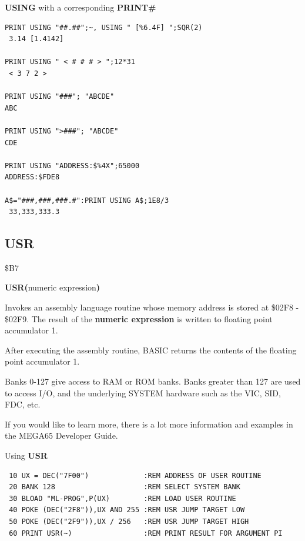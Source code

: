 \begin{description}[leftmargin=2cm,style=nextline]
\newpage
\item [Example:] {\bf USING} with a corresponding {\bf PRINT\#}

\begin{tcolorbox}[colback=black,coltext=white]
\verbatimfont{\codefont}
\begin{verbatim}
PRINT USING "##.##";~, USING " [%6.4F] ";SQR(2)
 3.14 [1.4142]

PRINT USING " < # # # > ";12*31
 < 3 7 2 >

PRINT USING "###"; "ABCDE"
ABC

PRINT USING ">###"; "ABCDE"
CDE

PRINT USING "ADDRESS:$%4X";65000
ADDRESS:$FDE8

A$="###,###,###.#":PRINT USING A$;1E8/3
 33,333,333.3
\end{verbatim}
\end{tcolorbox}
\end{description}


\newpage
\subsection{USR}
\begin{description}[leftmargin=2cm,style=nextline]
\item [Token:] \$B7
\item [Format:] {\bf USR(}numeric expression{\bf)}
\item [Usage:] Invokes an assembly language routine whose memory
               address is stored at  \$02F8 - \$02F9. The
               result of the {\bf numeric expression}
               is written to floating point accumulator 1.

               After executing the assembly routine, BASIC returns
               the contents of the floating point accumulator 1.

\item [Remarks:] Banks 0-127 give access to RAM or ROM banks.
                 Banks greater than 127 are used to access I/O, and the underlying SYSTEM hardware such as the
                 VIC, SID, FDC, etc.

                 If you would like to learn more, there is a lot more
                 information and examples in the MEGA65 Developer Guide.

\item [Example:] Using {\bf USR}

\begin{tcolorbox}[colback=black,coltext=white]
\verbatimfont{\codefont}
\begin{verbatim}
 10 UX = DEC("7F00")             :REM ADDRESS OF USER ROUTINE
 20 BANK 128                     :REM SELECT SYSTEM BANK
 30 BLOAD "ML-PROG",P(UX)        :REM LOAD USER ROUTINE
 40 POKE (DEC("2F8")),UX AND 255 :REM USR JUMP TARGET LOW
 50 POKE (DEC("2F9")),UX / 256   :REM USR JUMP TARGET HIGH
 60 PRINT USR(~)                 :REM PRINT RESULT FOR ARGUMENT PI
\end{verbatim}
\end{tcolorbox}
\end{description}

